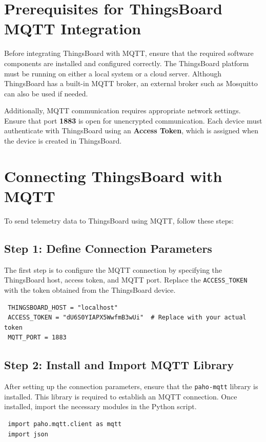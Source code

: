 \documentclass[a4paper,12pt]{report}
\begin{document}
 \section{Prerequisites for ThingsBoard MQTT Integration}

 Before integrating ThingsBoard with MQTT, ensure that the required software components are installed and configured correctly. The ThingsBoard platform must be running on either a local system or a cloud server. Although ThingsBoard has a built-in MQTT broker, an external broker such as Mosquitto can also be used if needed. 

 
 Additionally, MQTT communication requires appropriate network settings. Ensure that port \textbf{1883} is open for unencrypted communication. Each device must authenticate with ThingsBoard using an \textbf{Access Token}, which is assigned when the device is created in ThingsBoard.
 
 \section{Connecting ThingsBoard with MQTT}
 
 To send telemetry data to ThingsBoard using MQTT, follow these steps:
 
 \subsection{Step 1: Define Connection Parameters}
 The first step is to configure the MQTT connection by specifying the ThingsBoard host, access token, and MQTT port. Replace the \texttt{ACCESS\_TOKEN} with the token obtained from the ThingsBoard device.
 
 \begin{lstlisting}
 THINGSBOARD_HOST = "localhost"
 ACCESS_TOKEN = "dU6S0YIAPX5WwfmB3wUi"  # Replace with your actual token
 MQTT_PORT = 1883
 \end{lstlisting}
 
 \subsection{Step 2: Install and Import MQTT Library}
 After setting up the connection parameters, ensure that the \texttt{paho-mqtt} library is installed. This library is required to establish an MQTT connection. Once installed, import the necessary modules in the Python script.
 
 \begin{lstlisting}
 import paho.mqtt.client as mqtt
 import json
 \end{lstlisting}
 
\end{document}
